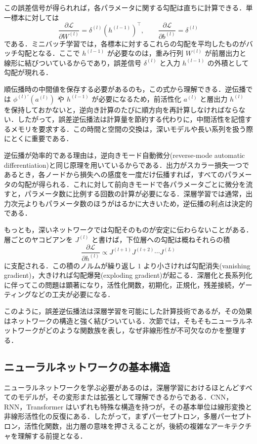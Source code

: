 この誤差信号が得られれば，各パラメータに関する勾配は直ちに計算できる．単一標本に対しては
\[
\frac{\partial \mathcal L}{\partial W^{(l)}}
= \delta^{(l)}(h^{(l-1)})^\top,
\qquad
\frac{\partial \mathcal L}{\partial b^{(l)}}
= \delta^{(l)}
\]
である．ミニバッチ学習では，各標本に対するこれらの勾配を平均したものがバッチ勾配となる．ここで $h^{(l-1)}$ が必要なのは，重み行列 $W^{(l)}$ が前層出力と線形に結びついているからであり，誤差信号 $\delta^{(l)}$ と入力 $h^{(l-1)}$ の外積として勾配が現れる．

順伝播時の中間値を保存する必要があるのも，この式から理解できる．逆伝播では $\phi^{(l)\prime}(a^{(l)})$ や $h^{(l-1)}$ が必要になるため，前活性化 $a^{(l)}$ と層出力 $h^{(l)}$ を保持しておかないと，逆向き計算のたびに順方向を再計算しなければならない．したがって，誤差逆伝播法は計算量を節約する代わりに，中間活性を記憶するメモリを要求する．この時間と空間の交換は，深いモデルや長い系列を扱う際にとくに重要である．

逆伝播が効率的である理由は，逆向きモード自動微分(reverse-mode automatic differentiation)と同じ原理を用いているからである．出力がスカラー損失一つであるとき，各ノードから損失への感度を一度だけ伝播すれば，すべてのパラメータの勾配が得られる．これに対して前向きモードで各パラメータごとに微分を流すと，パラメータ数に比例する回数の計算が必要になる．深層学習では通常，出力次元よりもパラメータ数のほうがはるかに大きいため，逆伝播の利点は決定的である．

もっとも，深いネットワークでは勾配そのものが安定に伝わらないことがある．層ごとのヤコビアンを $J^{(l)}$ と書けば，下位層への勾配は概ねそれらの積
\[
\frac{\partial \mathcal L}{\partial h^{(l)}}
\propto
J^{(l+1)}J^{(l+2)}\cdots J^{(L)}
\]
に支配される．この積のノルムが繰り返し $1$ より小さければ勾配消失(vanishing gradient)，大きければ勾配爆発(exploding gradient)が起こる．深層化と長系列化に伴ってこの問題は顕著になり，活性化関数，初期化，正規化，残差接続，ゲーティングなどの工夫が必要になる．

このように，誤差逆伝播法は深層学習を可能にした計算技術であるが，その効果はネットワークの構造と強く結びついている．次節では，そもそもニューラルネットワークがどのような関数族を表し，なぜ非線形性が不可欠なのかを整理する．

\subsection{ニューラルネットワークの基本構造}
ニューラルネットワークを学ぶ必要があるのは，深層学習におけるほとんどすべてのモデルが，その変形または拡張として理解できるからである．CNN，RNN，Transformer はいずれも特殊な構造を持つが，その基本単位は線形変換と非線形活性化の反復にある．したがって，まずパーセプトロン，多層パーセプトロン，活性化関数，出力層の意味を押さえることが，後続の複雑なアーキテクチャを理解する前提となる．

